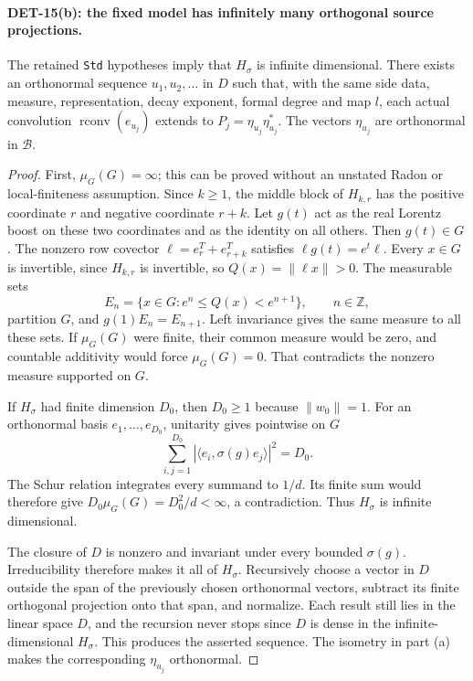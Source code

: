 \documentclass[11pt,a4paper]{article}
\begin{document}
\paragraph{DET-15(b): the fixed model has infinitely many orthogonal source projections.}
The retained \texttt{Std} hypotheses imply that \(H_\sigma\)
is infinite dimensional. There exists an orthonormal sequence
\(u_1,u_2,\ldots\) in \(D\) such that, with the same side data,
measure, representation, decay exponent, formal degree and map \(l\),
each actual convolution \(\operatorname{rconv}(e_{u_j})\)
extends to \(P_j=\eta_{u_j}\eta_{u_j}^*\).
The vectors \(\eta_{u_j}\) are orthonormal in \(\mathcal B\).
\begin{proof}
First, \(\mu_G(G)=\infty\); this can be proved without an
unstated Radon or local-finiteness assumption. Since \(k\ge1\),
the middle block of \(H_{k,r}\) has the positive coordinate \(r\)
and negative coordinate \(r+k\). Let \(g(t)\) act as the
real Lorentz boost on these two coordinates and as the identity
on all others. Then \(g(t)\in G\). The nonzero row covector
\(\ell=e_r^T+e_{r+k}^T\) satisfies \(\ell g(t)=e^t\ell\).
Every \(x\in G\) is invertible, since \(H_{k,r}\) is invertible,
so \(Q(x)=\|\ell x\|>0\). The measurable sets
\[
 E_n=\{x\in G:e^n\le Q(x)<e^{n+1}\},\qquad n\in\mathbb Z,
\]
partition \(G\), and \(g(1)E_n=E_{n+1}\).
Left invariance gives the same measure to all these sets.
If \(\mu_G(G)\) were finite, their common measure would be zero,
and countable additivity would force \(\mu_G(G)=0\).
That contradicts the nonzero measure supported on \(G\).

If \(H_\sigma\) had finite dimension \(D_0\), then \(D_0\ge1\)
because \(\|w_0\|=1\). For an orthonormal basis \(e_1,\ldots,e_{D_0}\),
unitarity gives pointwise on \(G\)
\[
 \sum_{i,j=1}^{D_0}
 |\langle e_i,\sigma(g)e_j\rangle|^2=D_0.
\]
The Schur relation integrates every summand to \(1/d\).
Its finite sum would therefore give
\(D_0\mu_G(G)=D_0^2/d<\infty\), a contradiction.
Thus \(H_\sigma\) is infinite dimensional.

The closure of \(D\) is nonzero and invariant under every bounded
\(\sigma(g)\). Irreducibility therefore makes it all of \(H_\sigma\).
Recursively choose a vector in \(D\) outside the span of the previously
chosen orthonormal vectors, subtract its finite orthogonal projection
onto that span, and normalize. Each result still lies in the
linear space \(D\), and the recursion never stops since \(D\)
is dense in the infinite-dimensional \(H_\sigma\).
This produces the asserted sequence. The isometry in part (a)
makes the corresponding \(\eta_{u_j}\) orthonormal.


\end{proof}
\end{document}
